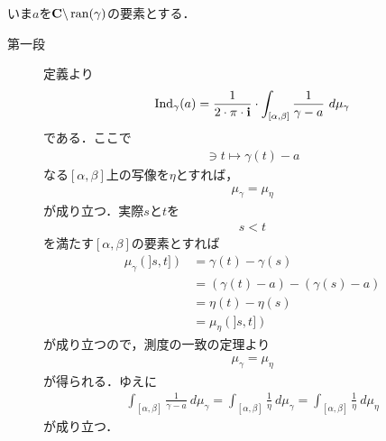 	\begin{sketch}
		いま$a$を$\mathbf{C} \backslash \operatorname*{ran} (\gamma)$の要素とする．
		\begin{description}
			\item[第一段]
				定義より
				\begin{align}
					\operatorname{Ind}_{\gamma}(a) = \frac{1}{2\cdot\pi\cdot\mathbf{i}} \cdot \int_{[\alpha,\beta]} \frac{1}{\gamma - a}\ d\mu_{\gamma}
				\end{align}
				である．ここで
				\begin{align}
					[\alpha,\beta] \ni t \longmapsto \gamma(t) - a
				\end{align}
				なる$[\alpha,\beta]$上の写像を$\eta$とすれば，
				\begin{align}
					\mu_{\gamma} = \mu_{\eta}
				\end{align}
				が成り立つ．実際$s$と$t$を
				\begin{align}
					s < t
				\end{align}
				を満たす$[\alpha,\beta]$の要素とすれば
				\begin{align}
					\mu_{\gamma}(]s,t]) &= \gamma(t) - \gamma(s) \\
					&= (\gamma(t) - a) - (\gamma(s) - a) \\
					&= \eta(t) - \eta(s) \\
					&= \mu_{\eta}(]s,t])
				\end{align}
				が成り立つので，測度の一致の定理より
				\begin{align}
					\mu_{\gamma} = \mu_{\eta}
				\end{align}
				が得られる．ゆえに
				\begin{align}
					\int_{[\alpha,\beta]} \frac{1}{\gamma - a}\ d\mu_{\gamma}
					= \int_{[\alpha,\beta]} \frac{1}{\eta}\ d\mu_{\gamma}
					= \int_{[\alpha,\beta]} \frac{1}{\eta}\ d\mu_{\eta}
				\end{align}
				が成り立つ．
				

\end{description}
\end{sketch}
